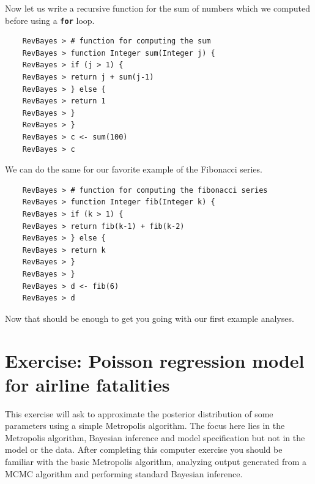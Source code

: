 \documentclass[11pt]{article}
\newcommand{\cl}[1]{{\texttt{\textbf{#1}}}}
\begin{document}
Now let us write a recursive function for the sum of numbers which we computed before using a \cl{for} loop.
{\tt \begin{snugshade*}
\begin{lstlisting}    
    RevBayes > # function for computing the sum
    RevBayes > function Integer sum(Integer j) {
    RevBayes > if (j > 1) {
    RevBayes > return j + sum(j-1)
    RevBayes > } else {
    RevBayes > return 1
    RevBayes > }
    RevBayes > }
    RevBayes > c <- sum(100)
    RevBayes > c
\end{lstlisting}
\end{snugshade*}}
We can do the same for our favorite example of the Fibonacci series.
{\tt \begin{snugshade*}
\begin{lstlisting}    
    RevBayes > # function for computing the fibonacci series
    RevBayes > function Integer fib(Integer k) {
    RevBayes > if (k > 1) {
    RevBayes > return fib(k-1) + fib(k-2)
    RevBayes > } else {
    RevBayes > return k
    RevBayes > }
    RevBayes > }
    RevBayes > d <- fib(6)
    RevBayes > d
\end{lstlisting}
\end{snugshade*}}
Now that should be enough to get you going with our first example analyses.

\newpage
\FloatBarrier
\section{Exercise: Poisson regression model for airline fatalities}

This exercise will ask to approximate the posterior distribution of some parameters using a simple Metropolis algorithm. 
The focus here lies in the Metropolis algorithm, Bayesian inference and model specification but not in the model or the data. 
After completing this computer exercise you should be familiar with the basic Metropolis algorithm, analyzing output generated from a MCMC algorithm and performing standard Bayesian inference.
\end{document}
